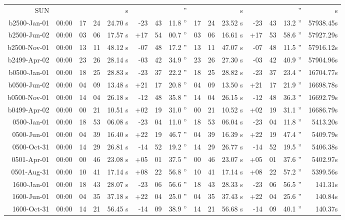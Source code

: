 \begin{longtable}{r@{\,}r|r@{h\,}r@{m\,}r<{s}|r@{°\,}r@{'\,}r<{''}||r@{h\,}r@{m\,}r<{s}|r@{°\,}r@{'\,}r<{''}r<{s}}
SUN\\
b2500-Jan-01 & 00:00  &   17 & 24 & 24.70 & -23 & 43 & 11.8 & 17&24&23.52 & -23&43&13.2 & 57938.45\\ %
b2500-Jun-02 & 00:00  &   03 & 06 & 17.57 & +17 & 54 & 00.7 & 03&06&16.61 & +17&53&58.6 & 57927.29\\ %
b2500-Nov-01 & 00:00  &   13 & 11 & 48.12 & -07 & 48 & 17.2 & 13&11&47.07 & -07&48&11.5 & 57916.12\\ %
b2499-Apr-02 & 00:00  &   23 & 26 & 28.14 & -03 & 42 & 34.9 & 23&26&27.30 & -03&42&40.9 & 57904.96\\ %
b0500-Jan-01 & 00:00  &   18 & 25 & 28.83 & -23 & 37 & 22.2 & 18&25&28.82 & -23&37&23.4 & 16704.77\\ %
b0500-Jun-02 & 00:00  &   04 & 09 & 13.48 & +21 & 17 & 20.8 & 04&09&13.50 & +21&17&21.9 & 16698.78\\ %
b0500-Nov-01 & 00:00  &   14 & 04 & 26.18 & -12 & 48 & 35.8 & 14&04&26.15 & -12&48&36.3 & 16692.79\\ %
b0499-Apr-02 & 00:00  &   00 & 21 & 10.51 & +02 & 19 & 31.0 & 00&21&10.52 & +02&19&31.1 & 16686.79\\ %
 0500-Jan-01 & 00:00  &   18 & 53 & 06.08 & -23 & 04 & 11.0 & 18&53&06.04 & -23&04&11.8 & 5413.20\\ %
 0500-Jun-01 & 00:00  &   04 & 39 & 16.40 & +22 & 19 & 46.7 & 04&39&16.39 & +22&19&47.4 & 5409.79\\ %
 0500-Oct-31 & 00:00  &   14 & 29 & 26.81 & -14 & 52 & 19.2 & 14&29&26.77 & -14&52&19.5 & 5406.38\\ %
 0501-Apr-01 & 00:00  &   00 & 46 & 23.08 & +05 & 01 & 37.5 & 00&46&23.07 & +05&01&37.6 & 5402.97\\ %
 0501-Aug-31 & 00:00  &   10 & 41 & 17.14 & +08 & 22 & 56.8 & 10&41&17.14 & +08&22&57.2 & 5399.56\\ %
 1600-Jan-01 & 00:00  &   18 & 43 & 28.07 & -23 & 06 & 56.6 & 18&43&28.33 & -23&06&56.5 & 141.31\\ %
 1600-Jun-01 & 00:00  &   04 & 35 & 37.18 & +22 & 04 & 25.0 & 04&35&37.43 & +22&04&25.6 & 140.84\\ %
 1600-Oct-31 & 00:00  &   14 & 21 & 56.45 & -14 & 09 & 38.9 & 14&21&56.68 & -14&09&40.1 & 140.37\\ %

\end{longtable}
